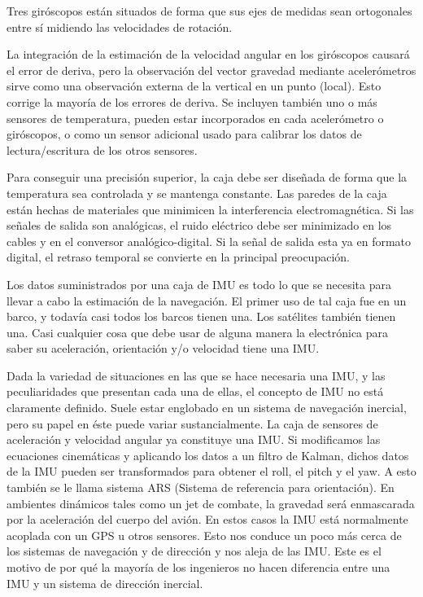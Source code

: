 		Tres giróscopos están situados de forma que sus ejes de medidas sean ortogonales entre sí midiendo las velocidades de rotación.
		
		La integración de la estimación de la velocidad angular en los giróscopos causará el error de deriva, pero la observación del vector gravedad mediante acelerómetros sirve como una observación externa de la vertical en un punto (local). Esto corrige la mayoría de los errores de deriva. Se incluyen también uno o más sensores de temperatura, pueden estar incorporados en cada acelerómetro o giróscopos, o como un sensor adicional usado para calibrar los datos de lectura/escritura de los otros sensores.
		
		Para conseguir una precisión superior, la caja debe ser diseñada de forma que la temperatura sea controlada y se mantenga constante. Las paredes de la caja están hechas de materiales que minimicen la interferencia electromagnética. Si las señales de salida son analógicas, el ruido eléctrico debe ser minimizado en los cables y en el conversor analógico-digital. Si la señal de salida esta ya en formato digital, el retraso temporal se convierte en la principal preocupación.
		
		Los datos suministrados por una caja de IMU es todo lo que se necesita para llevar a cabo la estimación de la navegación. El primer uso de tal caja fue en un barco, y todavía casi todos los barcos tienen una. Los satélites también tienen una. Casi cualquier cosa que debe usar de alguna manera la electrónica para saber su aceleración, orientación y/o velocidad tiene una IMU. 
		
		Dada la variedad de situaciones en las que se hace necesaria una IMU, y las peculiaridades que presentan cada una de ellas, el concepto de IMU no está claramente definido. Suele estar englobado en un sistema de navegación inercial, pero su papel en éste puede variar sustancialmente. La caja de sensores de aceleración y velocidad angular ya constituye una IMU. Si modificamos las ecuaciones cinemáticas y aplicando los datos a un filtro de Kalman, dichos datos de la IMU pueden ser transformados para obtener el roll, el pitch y el yaw. A esto también se le llama sistema ARS (Sistema de referencia para orientación). En ambientes dinámicos tales como un jet de combate, la gravedad será enmascarada por la aceleración del cuerpo del avión. En estos casos la IMU está normalmente acoplada con un GPS u otros sensores. Esto nos conduce un poco más cerca de los sistemas de navegación y de dirección y nos aleja de las IMU. Este es el motivo de por qué la mayoría de los ingenieros no hacen diferencia entre una IMU y un sistema de dirección inercial.
		
